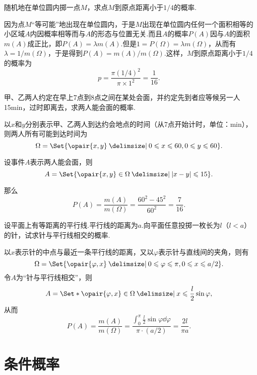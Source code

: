 \begin{example}
随机地在单位圆内掷一点\(M\)，求点\(M\)到原点距离小于\(1/4\)的概率.
\begin{solution}
因为点\(M\)“等可能”地出现在单位圆内，于是\(M\)出现在单位圆内任何一个面积相等的小区域\(A\)内因概率相等而与\(A\)的形态与位置无关.而且\(A\)的概率\(P(A)\)因与\(A\)的面积\(m(A)\)成正比，即\(P(A)=\lambda m(A)\).但是\(1 = P(\Omega) = \lambda m(\Omega)\)，从而有\(\lambda = 1/m(\Omega)\)，于是得到\(P(A) = m(A)/m(\Omega)\).这样，\(M\)到原点距离小于\(1/4\)的概率为\[
p = \frac{\pi (1/4)^2}{\pi \times 1^2} = \frac{1}{16}.
\]
\end{solution}
\end{example}

\begin{example}[会面问题]
甲、乙两人约定在早上7点到8点之间在某处会面，并约定先到者应等候另一人15min，过时即离去，求两人能会面的概率.
\begin{solution}
以\(x\)和\(y\)分别表示甲、乙两人到达约会地点的时间（从7点开始计时，单位：min），则两人所有可能到达时间为\[
\Omega = \Set{ \opair{x,y} \given 0 \leqslant x \leqslant 60, 0 \leqslant y \leqslant 60 }.
\]

设事件\(A\)表示两人能会面，则\[
A = \Set{ \opair{x,y}\in\Omega \given \abs{x-y} \leqslant 15 }.
\]

那么\[
P(A) = \frac{m(A)}{m(\Omega)} = \frac{60^2 - 45^2}{60^2} = \frac{7}{16}.
\]
\end{solution}
\end{example}

\begin{example}
设平面上有等距离的平行线.平行线的距离为\(a\).向平面任意投掷一枚长为\(l\)（\(l<a\)）的针，试求针与平行线相交的概率.
\begin{solution}
以\(x\)表示针的中点与最近一条平行线的距离，又以\(\varphi\)表示针与直线间的夹角，则有\[
\Omega = \Set{ \opair{\varphi,x} \given 0 \leqslant \varphi \leqslant \pi, 0 \leqslant x \leqslant a/2 }.
\]令\(A\)为“针与平行线相交”，则\[
A = \Set*{ \opair{\varphi,x}\in\Omega \given x \leqslant \frac{l}{2} \sin\varphi },
\]从而\[
P(A) = \frac{m(A)}{m(\Omega)} = \frac{\int_0^{\pi}\frac{l}{2} \sin\varphi \dd{\varphi}}{\pi \cdot (a/2)} = \frac{2l}{\pi a}.
\]
\end{solution}
\end{example}

\section{条件概率}

